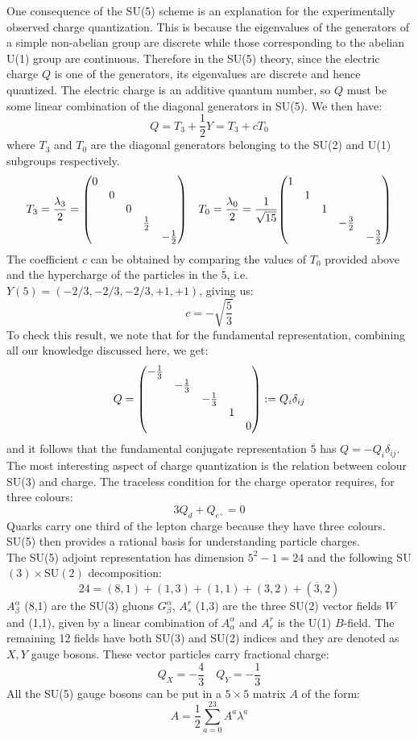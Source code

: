 \documentclass[../main.tex]{subfiles}
\begin{document}
One consequence of the SU(5) scheme is an explanation for the experimentally observed charge quantization. This is because the eigenvalues of the generators of a simple non-abelian group are discrete while those corresponding to the abelian U(1) group are continuous. Therefore in the SU(5) theory, since the electric charge $Q$ is one of the generators, its eigenvalues are discrete and hence quantized. The electric charge is an additive quantum number, so $Q$ must be some linear combination of the diagonal generators in SU(5). We then have:
\[
Q=T_3+\frac{1}{2}Y=T_3+cT_0
\]
where $T_3$ and $T_0$ are the diagonal generators belonging to the SU(2) and U(1) subgroups respectively.
\[
T_3=\frac{\lambda_3}{2}=\mqty(\dmat{0,0,0,\frac{1}{2},-\frac{1}{2}}) \quad T_0=\frac{\lambda_0}{2}=\frac{1}{\sqrt{15}}\mqty(\dmat{1,1,1,-\frac{3}{2},-\frac{3}{2}})
\]
The coefficient $c$ can be obtained by comparing the values of $T_0$ provided above and the hypercharge of the particles in the $\overline{5}$, i.e. $Y(5)=(-2/3,-2/3,-2/3,+1,+1)$, giving us:
\[
c=-\sqrt{\frac{5}{3}}
\]
To check this result, we note that for the fundamental representation, combining all our knowledge discussed here, we get:
\[
Q=\mqty(\dmat{-\frac{1}{3},-\frac{1}{3},-\frac{1}{3},1,0}):=Q_i\delta_{ij}
\]
and it follows that the fundamental conjugate representation $\overline{5}$ has $Q=-Q_i\delta_{ij}$. The most interesting aspect of charge quantization is the relation between colour SU(3) and charge. The traceless condition for the charge operator requires, for three colours:
\[
3Q_d+Q_{e^+}=0
\]
Quarks carry one third of the lepton charge because they have three colours. SU(5) then provides a rational basis for understanding particle charges.\\
The SU(5) adjoint representation has dimension $5^2-1=24$ and the following SU$(3)\times$SU$(2)$ decomposition:
\[
24=(8,1)+(1,3)+(1,1)+(3,2)+(\overline{3},2)
\]
$A_\beta^\alpha$ (8,1) are the SU(3) gluons $G_\beta^\alpha$, $A_s^r$ (1,3) are the three SU(2) vector fields $W$ and (1,1), given by a linear combination of $A_\alpha^\alpha$ and $A_r^r$ is the U(1) $B$-field. The remaining 12 fields have both SU(3) and SU(2) indices and they are denoted as $X,Y$ gauge bosons. These vector particles carry fractional charge:
\[
Q_X=-\frac{4}{3} \quad Q_Y=-\frac{1}{3}
\]
All the SU(5) gauge bosons can be put in a $5\times5$ matrix $A$ of the form:
\[
A=\frac{1}{2}\sum_{a=0}^{23}A^a\lambda^a
\]
\end{document}
